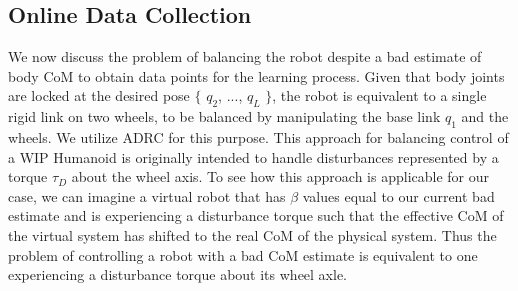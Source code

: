 \documentclass[letterpaper, 10 pt, conference]{ieeeconf}
\begin{document}
\subsection{Online Data Collection} \label{subsec: online}
We now discuss the problem of balancing the robot despite a bad estimate of body
\ac{CoM} to obtain data points for the learning process. Given that body joints
are locked at the desired pose $\{$ $q_2$, $...$, $q_L$ $\}$, the robot is
equivalent to a single rigid link on two wheels, to be balanced by manipulating
the base link $q_1$ and the wheels. We utilize \ac{ADRC}
\cite{canete2012disturbance} for this purpose. This approach for balancing
control of a \ac{WIP} Humanoid is originally intended to handle disturbances
represented by a torque $\tau_D$ about the wheel axis. To see how this approach
is applicable for our case, we can imagine a virtual robot that has $\beta$
values equal to our current bad estimate and is experiencing a disturbance
torque such that the effective \ac{CoM} of the virtual system has shifted to the
real \ac{CoM} of the physical system. Thus the problem of controlling a robot
with a bad \ac{CoM} estimate is equivalent to one experiencing a disturbance
torque about its wheel axle.
\end{document}
